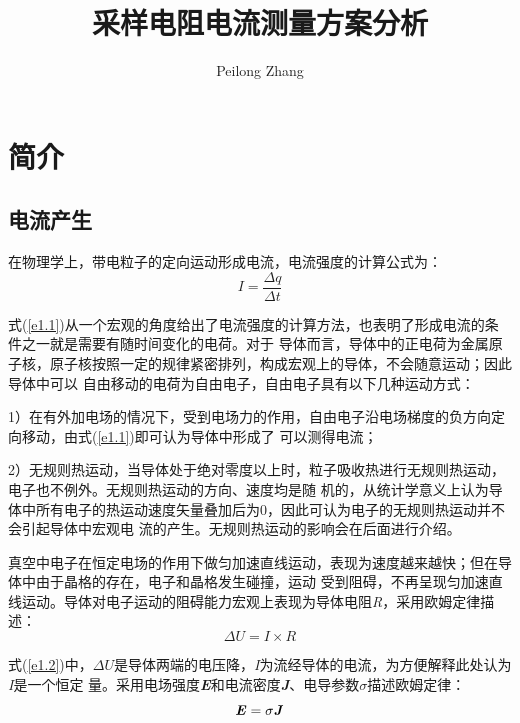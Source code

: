 \documentclass[UTF8]{ctexart}
\numberwithin{equation}{section} %
\numberwithin{figure}{section}
\begin{document}
\title{ 采样电阻电流测量方案分析}
\author{Peilong Zhang}
\date{} %
\maketitle
\thispagestyle{fancy} %


\section{简介}
\subsection{电流产生}

    在物理学上，带电粒子的定向运动形成电流，电流强度的计算公式为：
    \begin{equation}
        I = \frac{\Delta q}{\Delta t}
        \label{e1.1}
    \end{equation}
    \par %
    式(\ref{e1.1})从一个宏观的角度给出了电流强度的计算方法，也表明了形成电流的条件之一就是需要有随时间变化的电荷。对于
    导体而言，导体中的正电荷为金属原子核，原子核按照一定的规律紧密排列，构成宏观上的导体，不会随意运动；因此导体中可以
    自由移动的电荷为自由电子，自由电子具有以下几种运动方式：
    
    1）在有外加电场的情况下，受到电场力的作用，自由电子沿电场梯度的负方向定向移动，由式(\ref{e1.1})即可认为导体中形成了
    可以测得电流；
    
    2）无规则热运动，当导体处于绝对零度以上时，粒子吸收热进行无规则热运动，电子也不例外。无规则热运动的方向、速度均是随
    机的，从统计学意义上认为导体中所有电子的热运动速度矢量叠加后为0，因此可认为电子的无规则热运动并不会引起导体中宏观电
    流的产生。无规则热运动的影响会在后面进行介绍。

    真空中电子在恒定电场的作用下做匀加速直线运动，表现为速度越来越快；但在导体中由于晶格的存在，电子和晶格发生碰撞，运动
    受到阻碍，不再呈现匀加速直线运动。导体对电子运动的阻碍能力宏观上表现为导体电阻\textit{R}，采用欧姆定律描述：
    \begin{equation}
        \Delta U = I \times R
        \label{e1.2}
    \end{equation}
    
    式(\ref{e1.2})中，$\Delta U$是导体两端的电压降，\textit{I}为流经导体的电流，为方便解释此处认为\textit{I}是一个恒定
    量。采用电场强度\textbf{\emph{E}}和电流密度\textbf{\emph{J}}、电导参数$\sigma$描述欧姆定律：
    \begin{equation}
        \textbf{\emph{E}} = \sigma \textbf{\emph{J}}
        \label{e1.3}
    \end{equation}
\end{document}
